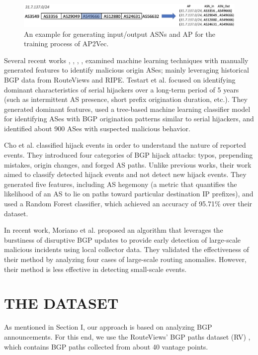 \documentclass[10pt,journal]{IEEEtran}
\begin{document}
\begin{figure}[htbp]
\centering
\includegraphics[width=\textwidth]{figures/fig1.png}
\caption{An example for generating input/output ASNs and AP for the training process of AP2Vec.}
\label{fig:ap2vec_training}
\end{figure}

Several recent works \cite{cho2019bgp}, \cite{ding2016detecting}, \cite{alshamrani2016ip}, \cite{testart2019profiling}, \cite{fontugne2018thin} examined machine learning techniques with manually generated features to identify malicious origin ASes; mainly leveraging historical BGP data from RouteViews \cite{routeviews} and RIPE. Testart et al. \cite{testart2019profiling} focused on identifying dominant characteristics of serial hijackers over a long-term period of 5 years (such as intermittent AS presence, short prefix origination duration, etc.). They generated dominant features, used a tree-based machine learning classifier model for identifying ASes with BGP origination patterns similar to serial hijackers, and identified about 900 ASes with suspected malicious behavior.

Cho et al. \cite{cho2019bgp} classified hijack events in order to understand the nature of reported events. They introduced four categories of BGP hijack attacks: typos, prepending mistakes, origin changes, and forged AS paths. Unlike previous works, their work aimed to classify detected hijack events and not detect new hijack events. They generated five features, including AS hegemony \cite{fontugne2018thin} (a metric that quantifies the likelihood of an AS to lie on paths toward particular destination IP prefixes), and used a Random Forest classifier, which achieved an accuracy of 95.71\% over their dataset.

In recent work, Moriano et al. \cite{moriano2021using} proposed an algorithm that leverages the burstiness of disruptive BGP updates to provide early detection of large-scale malicious incidents using local collector data. They validated the effectiveness of their method by analyzing four cases of large-scale routing anomalies. However, their method is less effective in detecting small-scale events.


\section{THE DATASET}
As mentioned in Section I, our approach is based on analyzing BGP announcements. For this end, we use the RouteViews' BGP paths dataset (RV) \cite{routeviews}, which contains BGP paths collected from about 40 vantage points.
\end{document}
